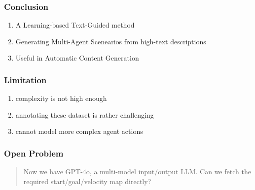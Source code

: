 \begin{frame}
    \frametitle{Conclusion}
    \begin{enumerate}
        \item A Learning-based Text-Guided method
        \item Generating Multi-Agent Scenearios from high-text descriptions 
        \item Useful in Automatic Content Generation
    \end{enumerate}
\end{frame}

\begin{frame}
    \frametitle{Limitation}
    \begin{enumerate}
        \item complexity is not high enough 
        \item annotating these dataset is rather challenging
        \item cannot model more complex agent actions
    \end{enumerate}
\end{frame}

\begin{frame}
    \frametitle{Open Problem}
    \begin{quote}
        Now we have GPT-4o, a multi-model input/output LLM. 
        Can we fetch the required start/goal/velocity map directly?
    \end{quote}
\end{frame}